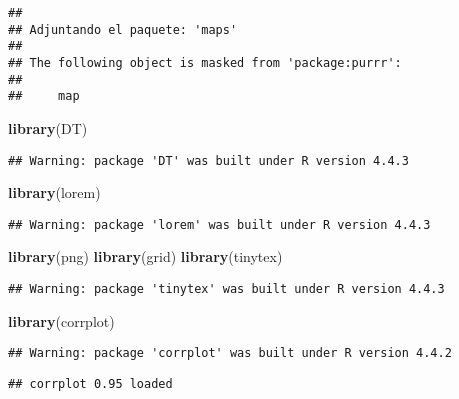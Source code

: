 \documentclass[
]{article}
\newenvironment{Shaded}{\begin{snugshade}}{\end{snugshade}}
\newcommand{\FunctionTok}[1]{\textcolor[rgb]{0.13,0.29,0.53}{\textbf{#1}}}
\newcommand{\NormalTok}[1]{#1}
\begin{document}
\begin{verbatim}
## 
## Adjuntando el paquete: 'maps'
## 
## The following object is masked from 'package:purrr':
## 
##     map
\end{verbatim}

\begin{Shaded}
\begin{Highlighting}[]
\FunctionTok{library}\NormalTok{(DT)}
\end{Highlighting}
\end{Shaded}

\begin{verbatim}
## Warning: package 'DT' was built under R version 4.4.3
\end{verbatim}

\begin{Shaded}
\begin{Highlighting}[]
\FunctionTok{library}\NormalTok{(lorem)}
\end{Highlighting}
\end{Shaded}

\begin{verbatim}
## Warning: package 'lorem' was built under R version 4.4.3
\end{verbatim}

\begin{Shaded}
\begin{Highlighting}[]
\FunctionTok{library}\NormalTok{(png)}
\FunctionTok{library}\NormalTok{(grid)}
\FunctionTok{library}\NormalTok{(tinytex)}
\end{Highlighting}
\end{Shaded}

\begin{verbatim}
## Warning: package 'tinytex' was built under R version 4.4.3
\end{verbatim}

\begin{Shaded}
\begin{Highlighting}[]
\FunctionTok{library}\NormalTok{(corrplot)}
\end{Highlighting}
\end{Shaded}

\begin{verbatim}
## Warning: package 'corrplot' was built under R version 4.4.2
\end{verbatim}

\begin{verbatim}
## corrplot 0.95 loaded
\end{verbatim}
\end{document}

